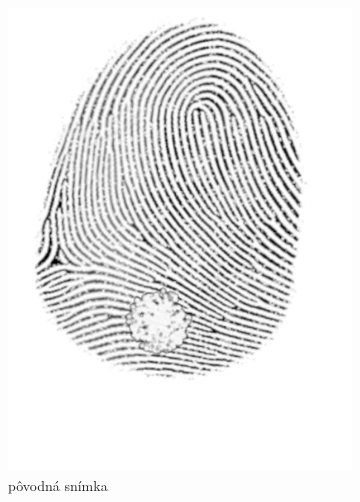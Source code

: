   \begin{figure}[h]
    \centering
    \begin{subfigure}[b]{0.3\linewidth}
      \includegraphics[width=\linewidth]{obrazky-figures/roi_template.png}
      \caption{pôvodná snímka}
      \label{obr:roi_template}
    \end{subfigure}
    \hfill
    \begin{subfigure}[b]{0.3\linewidth}

\end{subfigure}
\end{figure}
